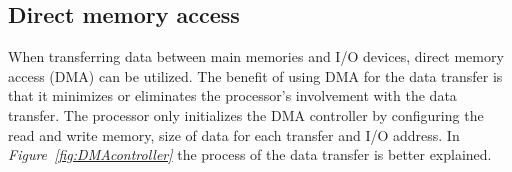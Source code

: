 





\clearpage

\subsection{Direct memory access}

When transferring data between main memories and I/O devices, direct memory access (DMA) can be utilized.
The benefit of using DMA for the data transfer is that it minimizes or eliminates the processor's involvement with the data transfer.
The processor only initializes the DMA controller by configuring the read and write memory, size of data for each transfer and I/O address.
In \textit{Figure~\ref{fig:DMAcontroller}} the process of the data transfer is better explained.

